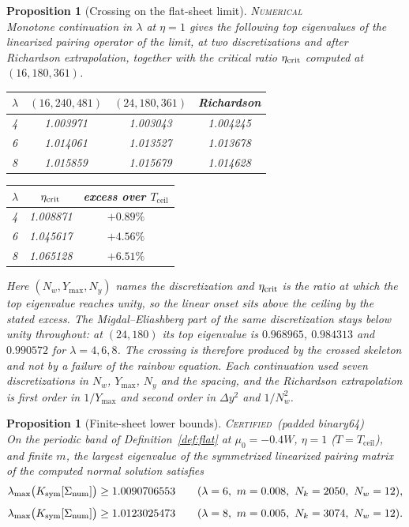 \documentclass[11pt]{article}
\newcommand{\CERT}{\upshape\mdseries\textsc{Certified}}
\newcommand{\NUM}{\upshape\mdseries\textsc{Numerical}}
\newcommand{\Tceil}{T_{\mathrm{ceil}}}
\newtheorem{proposition}[theorem]{Proposition}
\theoremstyle{definition}
\theoremstyle{remark}
\begin{document}
\begin{proposition}[Crossing on the flat-sheet limit]\label{prop:flatcross}\hfill\NUM\\
Monotone continuation in $\lambda$ at $\eta=1$ gives the following top eigenvalues of the linearized pairing operator of the limit, at two discretizations and after Richardson extrapolation, together with the critical ratio $\eta_{\rm crit}$ computed at $(16,180,361)$.
\begin{center}
\begin{tabular}{lccc}
$\lambda$ & $(16,240,481)$ & $(24,180,361)$ & Richardson \\
\hline
4 & 1.003971 & 1.003043 & 1.004245 \\
6 & 1.014061 & 1.013527 & 1.013678 \\
8 & 1.015859 & 1.015679 & 1.014628 \\
\end{tabular}
\qquad
\begin{tabular}{lcc}
$\lambda$ & $\eta_{\rm crit}$ & excess over $\Tceil$ \\
\hline
4 & 1.008871 & $+0.89\%$ \\
6 & 1.045617 & $+4.56\%$ \\
8 & 1.065128 & $+6.51\%$ \\
\end{tabular}
\end{center}
Here $(N_w,Y_{\max},N_y)$ names the discretization and $\eta_{\rm crit}$ is the ratio at which the top eigenvalue reaches unity, so the linear onset sits above the ceiling by the stated excess. The Migdal--Eliashberg part of the same discretization stays below unity throughout: at $(24,180)$ its top eigenvalue is $0.968965$, $0.984313$ and $0.990572$ for $\lambda=4,6,8$. The crossing is therefore produced by the crossed skeleton and not by a failure of the rainbow equation. Each continuation used seven discretizations in $N_w$, $Y_{\max}$, $N_y$ and the spacing, and the Richardson extrapolation is first order in $1/Y_{\max}$ and second order in $\Delta y^2$ and $1/N_w^2$.
\end{proposition}

\begin{proposition}[Finite-sheet lower bounds]\label{prop:flatcert}\hfill\CERT\ (padded binary64)\\
On the periodic band of Definition~\ref{def:flat} at $\mu_0=-0.4W$, $\eta=1$ ($T=\Tceil$), and finite $m$, the largest eigenvalue of the symmetrized linearized pairing matrix of the computed normal solution satisfies
\begin{equation}\label{eq:flatcert}
\lambda_{\max}\big(K_{\rm sym}[\Sigma_{\rm num}]\big)\ge1.0090706553\qquad(\lambda=6,\ m=0.008,\ N_k=2050,\ N_w=12),
\end{equation}
\begin{equation}\label{eq:flatcert2}
\lambda_{\max}\big(K_{\rm sym}[\Sigma_{\rm num}]\big)\ge1.0123025473\qquad(\lambda=8,\ m=0.005,\ N_k=3074,\ N_w=12).
\end{equation}
\end{proposition}
\end{document}
